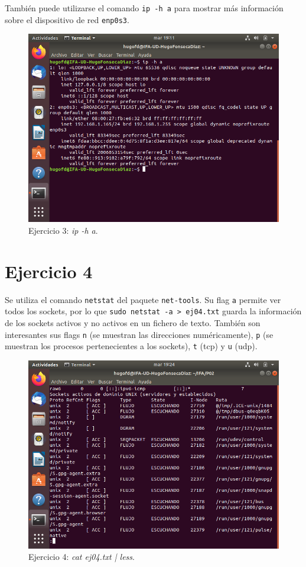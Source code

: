 \documentclass[11pt]{article}
\begin{document}
También puede utilizarse el comando \verb|ip -h a| para mostrar más información sobre el dispositivo de red \verb|enp0s3|.

\begin{figure}[H]
    \caption{Ejercicio 3: \textit{ip -h a}.}
  \centering
  \includegraphics[scale=0.7]{e3-3.png}
\end{figure}

\section{Ejercicio 4}
Se utiliza el comando \verb|netstat| del paquete \verb|net-tools|. Su flag \verb|a| permite ver todos los sockets, por lo que \verb|sudo netstat -a > ej04.txt| guarda la información de los sockets activos y no activos en un fichero de texto. También son interesantes sus flags \verb|n| (se muestran las direcciones numéricamente), \verb|p| (se muestran los procesos pertenecientes a los sockets), \verb|t| (tcp) y \verb|u| (udp).

\begin{figure}[H]
    \caption{Ejercicio 4: \textit{cat ej04.txt | less}.}
  \centering
  \includegraphics[scale=0.7]{e4-1.png}
\end{figure}
\end{document}
